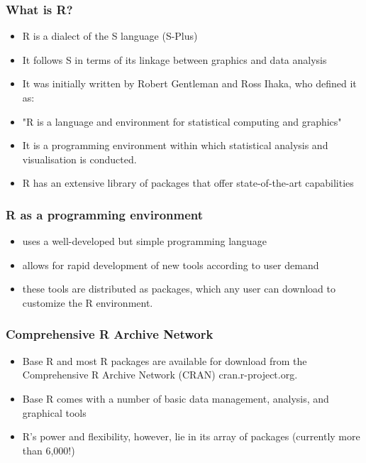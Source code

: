  	

	\begin{frame}
	\frametitle{What is R?}
	\begin{itemize}
		\item R is a dialect of the S language (S-Plus)
		\item It follows S in terms of its linkage between graphics and data analysis
		\item It was initially written by Robert Gentleman and Ross Ihaka, who defined it as:
		\item "R is a language and environment for statistical computing and graphics"
		\item It is a programming environment within which statistical analysis  and visualisation is conducted.
		\item R has an extensive library of packages that offer state-of-the-art capabilities
	\end{itemize}
	\end{frame}


 	\begin{frame}
	\frametitle{R as a programming environment}
 		
 		\begin{itemize}
 			\item uses a well-developed but simple programming language
 			\item allows for rapid development of new tools according to user demand
 			\item these tools are distributed as packages, which any user can download to customize the R
 			environment.
 		\end{itemize}
 	\end{frame}
 	
 	\begin{frame}
 		\frametitle{Comprehensive R Archive Network}
 		\begin{itemize}
 			\item Base R and most R packages are available for download from the Comprehensive R Archive Network
 			(CRAN) cran.r-project.org. 
 			\item Base R comes with a number of basic data management,
 			analysis, and graphical tools 
 			\item R’s power and flexibility, however, lie in its array of packages
 			(currently more than 6,000!)
 		\end{itemize}
 		
 	\end{frame}


